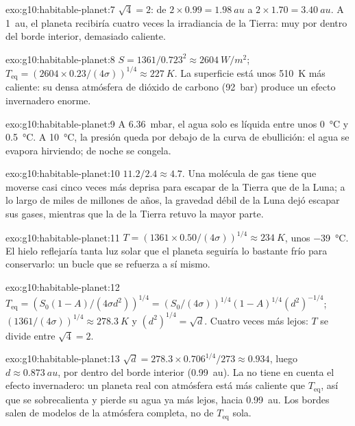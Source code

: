\begin{solution}{exo:g10:habitable-planet:7}
$\sqrt 4 = 2$: de $2 \times 0.99 = \qty{1.98}{au}$ a $2 \times 1.70 =
\qty{3.40}{au}$. A \qty{1}{au}, el planeta recibiría cuatro veces la
irradiancia de la Tierra: muy por dentro del borde interior, demasiado
caliente.
\end{solution}

\begin{solution}{exo:g10:habitable-planet:8}
$S = 1361/0.723^2 \approx \qty{2604}{W/m^2}$;
$T_{\mathrm{eq}} = (2604 \times 0.23/(4\sigma))^{1/4} \approx \qty{227}{K}$.
La superficie está unos \qty{510}{K} más caliente: su densa atmósfera de
dióxido de carbono (\qty{92}{bar}) produce un efecto invernadero enorme.
\end{solution}

\begin{solution}{exo:g10:habitable-planet:9}
A \qty{6.36}{mbar}, el agua solo es líquida entre unos
\qty{0}{\degreeCelsius} y \qty{0.5}{\degreeCelsius}. A
\qty{10}{\degreeCelsius}, la presión queda por debajo de la curva de
ebullición: el agua se evapora hirviendo; de noche se congela.
\end{solution}

\begin{solution}{exo:g10:habitable-planet:10}
$11.2/2.4 \approx 4.7$. Una molécula de gas tiene que moverse casi cinco
veces más deprisa para escapar de la Tierra que de la Luna; a lo largo de
miles de millones de años, la gravedad débil de la Luna dejó escapar sus
gases, mientras que la de la Tierra retuvo la mayor parte.
\end{solution}

\begin{solution}{exo:g10:habitable-planet:11}
$T = (1361 \times 0.50/(4\sigma))^{1/4} \approx \qty{234}{K}$, unos
\qty{-39}{\degreeCelsius}. El hielo reflejaría tanta luz solar que el
planeta seguiría lo bastante frío para conservarlo: un bucle que se refuerza
a sí mismo.
\end{solution}

\begin{solution}{exo:g10:habitable-planet:12}
$T_{\mathrm{eq}} = (S_0(1-A)/(4\sigma d^2))^{1/4} = (S_0/(4\sigma))^{1/4}
(1-A)^{1/4} (d^2)^{-1/4}$; $(1361/(4\sigma))^{1/4} \approx \qty{278.3}{K}$ y
$(d^2)^{1/4} = \sqrt d$. Cuatro veces más lejos: $T$ se divide entre $\sqrt 4 = 2$.
\end{solution}

\begin{solution}{exo:g10:habitable-planet:13}
$\sqrt d = 278.3 \times 0.706^{1/4}/273 \approx 0.934$, luego $d \approx
\qty{0.873}{au}$, por dentro del borde interior (\qty{0.99}{au}). La
 no tiene en cuenta el efecto invernadero: un
planeta real con atmósfera está más caliente que $T_{\mathrm{eq}}$, así que
se sobrecalienta y pierde su agua ya más lejos, hacia \qty{0.99}{au}. Los
bordes salen de modelos de la atmósfera completa, no de $T_{\mathrm{eq}}$
sola.
\end{solution}

